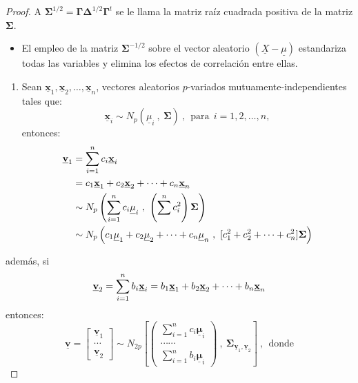 \documentclass[
]{book}
\providecommand{\tightlist}{%
  \setlength{\itemsep}{0pt}\setlength{\parskip}{0pt}}
\theoremstyle{definition}
\theoremstyle{definition}
\theoremstyle{definition}
\theoremstyle{definition}
\theoremstyle{remark}
\begin{document}
\begin{proof}
A \(\mathbf{\Sigma}^{1/2}=\mathbf{\Gamma} \mathbf{\Delta}^{1/2}\mathbf{\Gamma}^t\) se le llama la
matriz raíz cuadrada positiva de la matriz \(\mathbf{\Sigma}\).

\begin{itemize}
\tightlist
\item
  El empleo de la matriz \(\mathbf{\Sigma}^{-1/2}\) sobre el vector aleatorio \((\underline{X}-\underline{\mu})\) estandariza todas las variables y elimina los efectos de correlación entre ellas.
\end{itemize}

\begin{enumerate}
\def\labelenumi{\arabic{enumi}.}
\setcounter{enumi}{8}
\tightlist
\item
  Sean \(\underline{\mathbf{x}}_1,\underline{\mathbf{x}}_2,\ldots,\underline{\mathbf{x}}_n\), vectores aleatorios \(p\)-variados mutuamente-independientes tales que:
  \[
  \underline{\mathbf{x}}_i \sim N_p (\underline{\mu}_i \ , \ \mathbf{\Sigma})\ , \ \ \text{para} \ \ i=1,2,\ldots,n,
  \]
  entonces:
  \begin{align}
  \underline{\mathbf{v}}_1&=\sum_{i=1}^n c_i\underline{\mathbf{x}}_i \notag \\
  &= c_1\underline{\mathbf{x}}_1+c_2\underline{\mathbf{x}}_2+\cdots+c_n \underline{\mathbf{x}}_n \notag \\
  & \sim N_{p} \left(\sum_{i=1}^n c_i \underline{\mu}_i \ , \ \left( \sum_{}^n c_i^2 \right)\mathbf{\Sigma} \right)\\
  & \sim N_p \left( c_1\underline{\mu}_1+c_2\underline{\mu}_2+\cdots+c_n\underline{\mu}_n \ , \ [c_1^2+c_2^2+\cdots+c_n^2]\mathbf{\Sigma} \right) \notag 
  \label{eq:prop-9a}
  \end{align}
\end{enumerate}

además, si
\[
\underline{\mathbf{v}}_2=\sum_{i=1}^n b_i \underline{\mathbf{x}}_i\\
= b_1\underline{\mathbf{x}}_1+b_2\underline{\mathbf{x}}_2+\cdots+b_n \underline{\mathbf{x}}_n
\]
entonces:
\begin{equation}
\underline{\mathbf{v}}=\begin{bmatrix}
\underline{\mathbf{v}}_1 \\ \cdots \\ \underline{\mathbf{v}}_2
\end{bmatrix} \sim N_{2p} \left[ \begin{pmatrix}
\sum_{i=1}^n c_i \underline{\mathbf{\mu}}_i \\ \cdots\cdots \\ \sum_{i=1}^n b_i \underline{\mathbf{\mu}}_i
\end{pmatrix} \ , \ \mathbf{\Sigma}_{\underline{\mathbf{v}}_1,\underline{\mathbf{v}}_2} \right]\ , \ \ \text{donde}
\label{eq:prop-9b}
\end{equation}


\end{proof}
\end{document}
